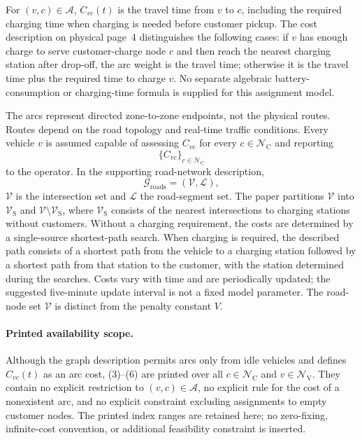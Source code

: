 \documentclass{article}
\begin{document}
For $(v,c)\in\mathcal A$, $C_{vc}(t)$ is the travel time from $v$ to $c$, including the required charging time when charging is needed before customer pickup. The cost description on physical page~4 distinguishes the following cases: if $v$ has enough charge to serve customer-charge node $c$ and then reach the nearest charging station after drop-off, the arc weight is the travel time; otherwise it is the travel time plus the required time to charge $v$. No separate algebraic battery-consumption or charging-time formula is supplied for this assignment model.

The arcs represent directed zone-to-zone endpoints, not the physical routes. Routes depend on the road topology and real-time traffic conditions. Every vehicle $v$ is assumed capable of assessing $C_{vc}$ for every $c\in\mathcal N_{\mathrm C}$ and reporting
\[
\{C_{vc}\}_{c\in\mathcal N_{\mathrm C}}
\]
to the operator. In the supporting road-network description,
\[
\mathcal G_{\mathrm{roads}}=(\mathcal V,\mathcal L),
\]
$\mathcal V$ is the intersection set and $\mathcal L$ the road-segment set. The paper partitions $\mathcal V$ into $\mathcal V_{\mathrm S}$ and $\mathcal V\setminus\mathcal V_{\mathrm S}$, where $\mathcal V_{\mathrm S}$ consists of the nearest intersections to charging stations without customers. Without a charging requirement, the costs are determined by a single-source shortest-path search. When charging is required, the described path consists of a shortest path from the vehicle to a charging station followed by a shortest path from that station to the customer, with the station determined during the searches. Costs vary with time and are periodically updated; the suggested five-minute update interval is not a fixed model parameter. The road-node set $\mathcal V$ is distinct from the penalty constant $V$.

\paragraph{Printed availability scope.}
Although the graph description permits arcs only from idle vehicles and defines $C_{vc}(t)$ as an arc cost, (3)--(6) are printed over all $c\in\mathcal N_{\mathrm C}$ and $v\in\mathcal N_{\mathrm V}$. They contain no explicit restriction to $(v,c)\in\mathcal A$, no explicit rule for the cost of a nonexistent arc, and no explicit constraint excluding assignments to empty customer nodes. The printed index ranges are retained here; no zero-fixing, infinite-cost convention, or additional feasibility constraint is inserted.
\end{document}
